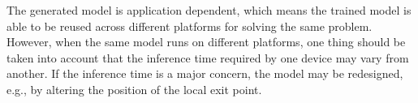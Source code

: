 \documentclass[conference]{IEEEtran}
\begin{document}
The generated model is application dependent, which means the trained model is able to be reused across different platforms for solving the same problem. However, when the same model runs on different platforms, one thing should be taken into account that the inference time required by one device may vary from another. If the inference time is a major concern, the model may be redesigned, e.g., by altering the position of the local exit point.
\end{document}
